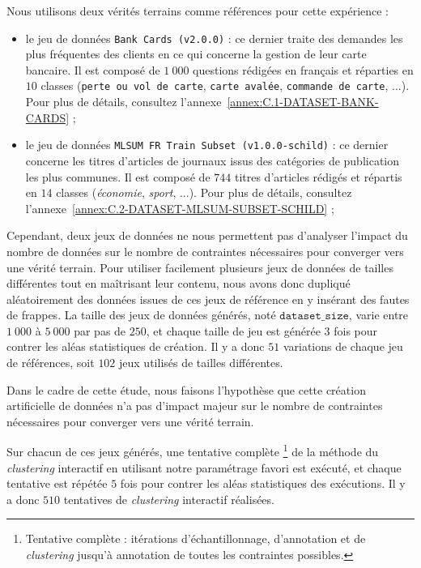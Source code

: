 			Nous utilisons deux vérités terrains comme références pour cette expérience :
			\begin{itemize}
				\item le jeu de données \texttt{Bank Cards (v2.0.0)} : ce dernier traite des demandes les plus fréquentes des clients en ce qui concerne la gestion de leur carte bancaire. Il est composé de $1~000$ questions rédigées en français et réparties en $10$ classes (\texttt{perte ou vol de carte}, \texttt{carte avalée}, \texttt{commande de carte}, ...). Pour plus de détails, consultez l'annexe~\ref{annex:C.1-DATASET-BANK-CARDS} ;
				\item le jeu de données \texttt{MLSUM FR Train Subset (v1.0.0-schild)} : ce dernier concerne les titres d'articles de journaux issus des catégories de publication les plus communes. Il est composé de $744$  titres d'articles rédigés et répartis en $14$ classes (\textit{économie}, \textit{sport}, ...). Pour plus de détails, consultez l'annexe~\ref{annex:C.2-DATASET-MLSUM-SUBSET-SCHILD} ;
			\end{itemize}

			Cependant, deux jeux de données ne nous permettent pas d'analyser l'impact du nombre de données sur le nombre de contraintes nécessaires pour converger vers une vérité terrain.
			Pour utiliser facilement plusieurs jeux de données de tailles différentes tout en maîtrisant leur contenu, nous avons donc dupliqué aléatoirement des données issues de ces jeux de référence en y insérant des fautes de frappes.
			La taille des jeux de données générés, noté $\texttt{dataset\_size}$, varie entre $1~000$ à $5~000$ par pas de $250$, et chaque taille de jeu est générée $3$ fois pour contrer les aléas statistiques de création.
			Il y a donc $51$ variations de chaque jeu de références, soit $102$ jeux utilisés de tailles différentes.
			
			\begin{leftBarWarning}
				Dans le cadre de cette étude, nous faisons l'hypothèse que cette création artificielle de données n'a pas d'impact majeur sur le nombre de contraintes nécessaires pour converger vers une vérité terrain.
			\end{leftBarWarning}
			
			Sur chacun de ces jeux générés, une tentative complète
			\footnote{Tentative complète : itérations d'échantillonnage, d'annotation et de \textit{clustering} jusqu'à annotation de toutes les contraintes possibles.}
			de la méthode du \textit{clustering} interactif en utilisant notre paramétrage favori est exécuté, et chaque tentative est répétée $5$ fois pour contrer les aléas statistiques des exécutions.
			Il y a donc $510$ tentatives de \textit{clustering} interactif réalisées.
			
